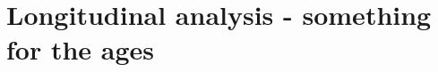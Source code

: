 \section[Longitudinal analysis]{Longitudinal analysis - something for the ages }
\label{variantcalling-sec:longitudinal}